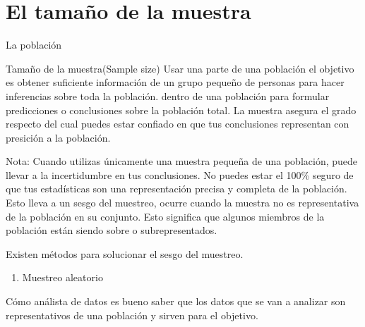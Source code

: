\begin{enumerate}
    
\end{enumerate}

\section{El tama\~no de la muestra}

La poblaci\'on 

Tama\~no de la muestra(Sample size)
Usar una parte de una poblaci\'on el objetivo es obtener suficiente informaci\'on de un grupo peque\~no de personas para hacer inferencias sobre toda la poblaci\'on.
dentro de una poblaci\'on para formular predicciones o conclusiones sobre la poblaci\'on total. La muestra asegura el grado respecto 
del cual puedes estar confiado en que tus conclusiones representan con presici\'on a la poblaci\'on.

Nota: Cuando utilizas \'unicamente una muestra peque\~na de una poblaci\'on, puede llevar a la incertidumbre en tus conclusiones. No puedes estar el 100\% seguro 
de que tus estad\'isticas son una representaci\'on precisa y completa de la poblaci\'on. Esto lleva a un sesgo del muestreo, ocurre cuando la muestra no es representativa de la 
poblaci\'on en su conjunto. Esto significa que algunos miembros de la poblaci\'on est\'an siendo sobre o subrepresentados. 

Existen m\'etodos para solucionar el sesgo del muestreo.

\begin{enumerate}
    \item Muestreo aleatorio
\end{enumerate}

C\'omo an\'alista de datos es bueno saber que los datos que se van a analizar son representativos de una poblaci\'on y sirven para el objetivo.

